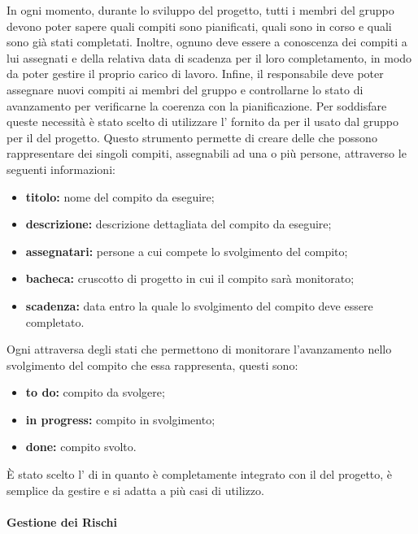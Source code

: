 			In ogni momento, durante lo sviluppo del progetto, tutti i membri del gruppo devono poter sapere quali compiti sono pianificati, quali sono in corso e quali sono già stati completati. Inoltre, ognuno deve essere a conoscenza dei compiti a lui assegnati e della relativa data di scadenza per il loro completamento, in modo da poter gestire il proprio carico di lavoro. Infine, il responsabile deve poter assegnare nuovi compiti ai membri del gruppo e controllarne lo stato di avanzamento per verificarne la coerenza con la pianificazione. 
			\newline
			Per soddisfare queste necessità è stato scelto di utilizzare l' fornito da  per il  usato dal gruppo per il  del progetto.
			\newline
			Questo strumento permette di creare delle  che possono rappresentare dei singoli compiti, assegnabili ad una o più persone, attraverso le seguenti informazioni:
			\begin{itemize}
				\item \textbf{titolo:} nome del compito da eseguire;
				\item \textbf{descrizione:} descrizione dettagliata del compito da eseguire;
				\item \textbf{assegnatari:} persone a cui compete lo svolgimento del compito;
				\item \textbf{bacheca:} cruscotto di progetto in cui il compito sarà monitorato;
				\item \textbf{scadenza:} data entro la quale lo svolgimento del compito deve essere completato. 
			\end{itemize}
			Ogni  attraversa degli stati che permettono di monitorare l'avanzamento nello svolgimento del compito che essa rappresenta, questi sono:
			\begin{itemize}
				\item \textbf{to do:} compito da svolgere;
				\item \textbf{in progress:} compito in svolgimento;
				\item \textbf{done:} compito svolto.
			\end{itemize}
			È stato scelto l' di  in quanto è completamente integrato con il  del progetto, è semplice da gestire e si adatta a più casi di utilizzo.
			
		\paragraph{Gestione dei Rischi}
			
